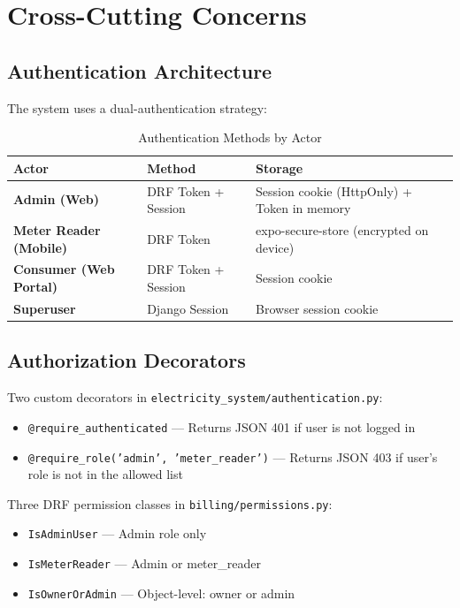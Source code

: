 \documentclass[12pt, a4paper]{report}
\newenvironment{featurelist}{%
    \begin{itemize}[leftmargin=1.5em, itemsep=2pt, parsep=0pt]
}{%
    \end{itemize}
}
\begin{document}
\chapter{Cross-Cutting Concerns}

\section{Authentication Architecture}

The system uses a dual-authentication strategy:

\begin{table}[H]
\centering
\caption{Authentication Methods by Actor}
\begin{tabularx}{\textwidth}{>{\bfseries}l l X}
\toprule
\textbf{Actor} & \textbf{Method} & \textbf{Storage} \\
\midrule
Admin (Web) & DRF Token + Session & Session cookie (HttpOnly) + Token in memory \\
Meter Reader (Mobile) & DRF Token & expo-secure-store (encrypted on device) \\
Consumer (Web Portal) & DRF Token + Session & Session cookie \\
Superuser & Django Session & Browser session cookie \\
\bottomrule
\end{tabularx}
\end{table}

\section{Authorization Decorators}

Two custom decorators in \texttt{electricity\_system/authentication.py}:

\begin{featurelist}
    \item \texttt{@require\_authenticated} — Returns JSON 401 if user is not logged in
    \item \texttt{@require\_role('admin', 'meter\_reader')} — Returns JSON 403 if user's role is not in the allowed list
\end{featurelist}

Three DRF permission classes in \texttt{billing/permissions.py}:
\begin{featurelist}
    \item \texttt{IsAdminUser} — Admin role only
    \item \texttt{IsMeterReader} — Admin or meter\_reader
    \item \texttt{IsOwnerOrAdmin} — Object-level: owner or admin
\end{featurelist}
\end{document}
